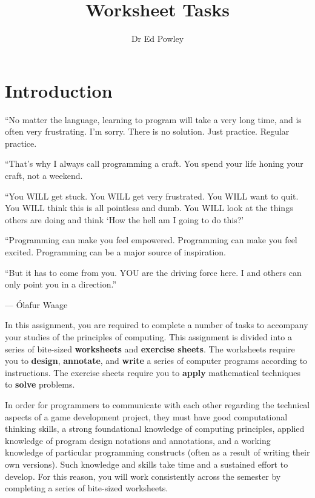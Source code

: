 \documentclass{../../fal_assignment}
\title{Worksheet Tasks}
\author{Dr Ed Powley}
\begin{document}
\maketitle

\section*{Introduction}

\begin{marginquote}
``No matter the language, learning to program will take a very long time, and is often very frustrating. I'm sorry. There is no solution. Just practice. Regular practice.

``That's why I always call programming a craft. You spend your life honing your craft, not a weekend.

``You WILL get stuck.
You WILL get very frustrated.
You WILL want to quit.
You WILL think this is all pointless and dumb.
You WILL look at the things others are doing and think `How the hell am I going to do this?'

``Programming can make you feel empowered.
Programming can make you feel excited.
Programming can be a major source of inspiration.

``But it has to come from you. YOU are the driving force here. I and others can only point you in a direction.''

\par --- \'Olafur Waage
\end{marginquote}

In this assignment, you are required to complete a number of tasks to accompany your studies of the principles of computing. This assignment is divided into a series of bite-sized \textbf{worksheets} and \textbf{exercise sheets}. The worksheets require you to \textbf{design}, \textbf{annotate}, and \textbf{write} a series of computer programs according to instructions. The exercise sheets require you to \textbf{apply} mathematical techniques to \textbf{solve} problems.

In order for programmers to communicate with each other regarding the technical aspects of a game development project, they must have good computational thinking skills, a strong foundational knowledge of computing principles, applied knowledge of program design notations and annotations, and a working knowledge of particular programming constructs (often as a result of writing their own versions). Such knowledge and skills take time and a sustained effort to develop. For this reason, you will work consistently across the semester by completing a series of bite-sized worksheets.
\end{document}
